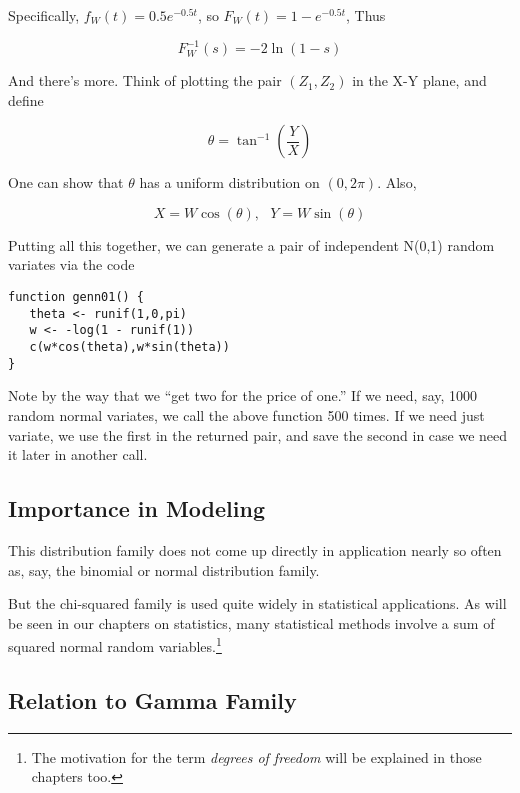 Specifically, $f_W(t) = 0.5 e^{-0.5t}$, so $F_W(t) = 1 - e^{-0.5t}$,
Thus

\begin{equation}
F_W^{-1}(s) = -2 \ln(1-s)
\end{equation}

And there's more.  Think of plotting the pair $(Z_1,Z_2)$ in the X-Y
plane, and define

\begin{equation}
\theta = \tan^{-1}(\frac{Y}{X})
\end{equation}

One can show that $\theta$ has a uniform distribution on
$(0,2\pi)$.  Also, 

\begin{equation}
X = W\cos(\theta), ~~~ Y = W\sin(\theta)
\end{equation}

Putting all this together, we can generate a pair of independent N(0,1)
random variates via the code

\begin{lstlisting}
function genn01() {
   theta <- runif(1,0,pi)
   w <- -log(1 - runif(1))
   c(w*cos(theta),w*sin(theta))
}
\end{lstlisting}

Note by the way that we ``get two for the price of one.''  If we need,
say, 1000 random normal variates, we call the above function 500 times.
If we need just variate, we use the first in the returned pair, and save
the second in case we need it later in another call.

\subsection{Importance in Modeling}

This distribution family does not come up directly in application nearly
so often as, say, the binomial or normal distribution family.

But the chi-squared family is used quite widely in statistical
applications.  As will be seen in our chapters on statistics, many
statistical methods involve a sum of squared normal random
variables.\footnote{The motivation for the term {\it degrees of freedom}
will be explained in those chapters too.}

\subsection{Relation to Gamma Family}

